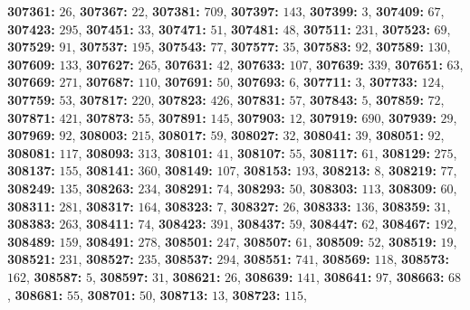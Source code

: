 \textsf{\bfseries 307361:} $26$, \textsf{\bfseries 307367:} $22$, \textsf{\bfseries 307381:} $709$, \textsf{\bfseries 307397:} $143$, \textsf{\bfseries 307399:} $3$, \textsf{\bfseries 307409:} $67$, \textsf{\bfseries 307423:} $295$, \textsf{\bfseries 307451:} $33$, \textsf{\bfseries 307471:} $51$, \textsf{\bfseries 307481:} $48$, \textsf{\bfseries 307511:} $231$, \textsf{\bfseries 307523:} $69$, \textsf{\bfseries 307529:} $91$, \textsf{\bfseries 307537:} $195$, \textsf{\bfseries 307543:} $77$, \textsf{\bfseries 307577:} $35$, \textsf{\bfseries 307583:} $92$, \textsf{\bfseries 307589:} $130$, \textsf{\bfseries 307609:} $133$, \textsf{\bfseries 307627:} $265$, \textsf{\bfseries 307631:} $42$, \textsf{\bfseries 307633:} $107$, \textsf{\bfseries 307639:} $339$, \textsf{\bfseries 307651:} $63$, \textsf{\bfseries 307669:} $271$, \textsf{\bfseries 307687:} $110$, \textsf{\bfseries 307691:} $50$, \textsf{\bfseries 307693:} $6$, \textsf{\bfseries 307711:} $3$, \textsf{\bfseries 307733:} $124$, \textsf{\bfseries 307759:} $53$, \textsf{\bfseries 307817:} $220$, \textsf{\bfseries 307823:} $426$, \textsf{\bfseries 307831:} $57$, \textsf{\bfseries 307843:} $5$, \textsf{\bfseries 307859:} $72$, \textsf{\bfseries 307871:} $421$, \textsf{\bfseries 307873:} $55$, \textsf{\bfseries 307891:} $145$, \textsf{\bfseries 307903:} $12$, \textsf{\bfseries 307919:} $690$, \textsf{\bfseries 307939:} $29$, \textsf{\bfseries 307969:} $92$, \textsf{\bfseries 308003:} $215$, \textsf{\bfseries 308017:} $59$, \textsf{\bfseries 308027:} $32$, \textsf{\bfseries 308041:} $39$, \textsf{\bfseries 308051:} $92$, \textsf{\bfseries 308081:} $117$, \textsf{\bfseries 308093:} $313$, \textsf{\bfseries 308101:} $41$, \textsf{\bfseries 308107:} $55$, \textsf{\bfseries 308117:} $61$, \textsf{\bfseries 308129:} $275$, \textsf{\bfseries 308137:} $155$, \textsf{\bfseries 308141:} $360$, \textsf{\bfseries 308149:} $107$, \textsf{\bfseries 308153:} $193$, \textsf{\bfseries 308213:} $8$, \textsf{\bfseries 308219:} $77$, \textsf{\bfseries 308249:} $135$, \textsf{\bfseries 308263:} $234$, \textsf{\bfseries 308291:} $74$, \textsf{\bfseries 308293:} $50$, \textsf{\bfseries 308303:} $113$, \textsf{\bfseries 308309:} $60$, \textsf{\bfseries 308311:} $281$, \textsf{\bfseries 308317:} $164$, \textsf{\bfseries 308323:} $7$, \textsf{\bfseries 308327:} $26$, \textsf{\bfseries 308333:} $136$, \textsf{\bfseries 308359:} $31$, \textsf{\bfseries 308383:} $263$, \textsf{\bfseries 308411:} $74$, \textsf{\bfseries 308423:} $391$, \textsf{\bfseries 308437:} $59$, \textsf{\bfseries 308447:} $62$, \textsf{\bfseries 308467:} $192$, \textsf{\bfseries 308489:} $159$, \textsf{\bfseries 308491:} $278$, \textsf{\bfseries 308501:} $247$, \textsf{\bfseries 308507:} $61$, \textsf{\bfseries 308509:} $52$, \textsf{\bfseries 308519:} $19$, \textsf{\bfseries 308521:} $231$, \textsf{\bfseries 308527:} $235$, \textsf{\bfseries 308537:} $294$, \textsf{\bfseries 308551:} $741$, \textsf{\bfseries 308569:} $118$, \textsf{\bfseries 308573:} $162$, \textsf{\bfseries 308587:} $5$, \textsf{\bfseries 308597:} $31$, \textsf{\bfseries 308621:} $26$, \textsf{\bfseries 308639:} $141$, \textsf{\bfseries 308641:} $97$, \textsf{\bfseries 308663:} $68$, \textsf{\bfseries 308681:} $55$, \textsf{\bfseries 308701:} $50$, \textsf{\bfseries 308713:} $13$, \textsf{\bfseries 308723:} $115$, 
